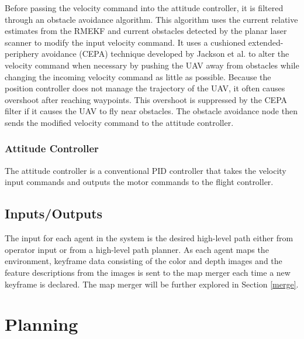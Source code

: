 \documentclass[letterpaper, 10 pt, conference]{ieeeconf}  %
\begin{document}
Before passing the velocity command into the attitude controller, it is filtered through an obstacle avoidance algorithm. This algorithm uses the current relative estimates from the RMEKF and current obstacles detected by the planar laser scanner to modify the input velocity command. It uses a cushioned extended-periphery avoidance (CEPA) technique developed by Jackson et al. \cite{Jackson2016} to alter the velocity command when necessary by pushing the UAV away from obstacles while changing the incoming velocity command as little as possible. Because the position controller does not manage the trajectory of the UAV, it often causes overshoot after reaching waypoints. This overshoot is suppressed by the CEPA filter if it causes the UAV to fly near obstacles. The obstacle avoidance node then sends the modified velocity command to the attitude controller.

\subsubsection{Attitude Controller}

The attitude controller is a conventional PID controller that takes the velocity input commands and outputs the motor commands to the flight controller.

\subsection{Inputs/Outputs}

The input for each agent in the system is the desired high-level path either from operator input or from a high-level path planner. As each agent maps the environment, keyframe data consisting of the color and depth images and the  feature descriptions from the images is sent to the map merger each time a new keyframe is declared. The map merger will be further explored in Section \ref{merge}.

\section{Planning}\label{planning}
\end{document}
